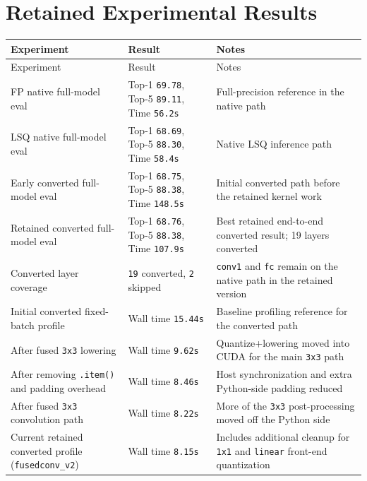\documentclass[11pt,a4paper]{article}
\begin{document}
\section{Retained Experimental Results}
\renewcommand{\arraystretch}{1.2}
\begin{longtable}{>{\raggedright\arraybackslash}p{} >{\raggedleft\arraybackslash}p{} >{\raggedright\arraybackslash}p{}}
\toprule
Experiment & Result & Notes \\
\midrule
\endfirsthead
\toprule
Experiment & Result & Notes \\
\midrule
\endhead
FP native full-model eval & Top-1 \texttt{69.78}, Top-5 \texttt{89.11}, Time \texttt{56.2s} & Full-precision reference in the native path \\
LSQ native full-model eval & Top-1 \texttt{68.69}, Top-5 \texttt{88.30}, Time \texttt{58.4s} & Native LSQ inference path \\
Early converted full-model eval & Top-1 \texttt{68.75}, Top-5 \texttt{88.38}, Time \texttt{148.5s} & Initial converted path before the retained kernel work \\
Retained converted full-model eval & Top-1 \texttt{68.76}, Top-5 \texttt{88.38}, Time \texttt{107.9s} & Best retained end-to-end converted result; 19 layers converted \\
Converted layer coverage & \texttt{19} converted, \texttt{2} skipped & \texttt{conv1} and \texttt{fc} remain on the native path in the retained version \\
Initial converted fixed-batch profile & Wall time \texttt{15.44s} & Baseline profiling reference for the converted path \\
After fused \texttt{3x3} lowering & Wall time \texttt{9.62s} & Quantize+lowering moved into CUDA for the main \texttt{3x3} path \\
After removing \texttt{.item()} and padding overhead & Wall time \texttt{8.46s} & Host synchronization and extra Python-side padding reduced \\
After fused \texttt{3x3} convolution path & Wall time \texttt{8.22s} & More of the \texttt{3x3} post-processing moved off the Python side \\
Current retained converted profile (\texttt{fusedconv\_v2}) & Wall time \texttt{8.15s} & Includes additional cleanup for \texttt{1x1} and \texttt{linear} front-end quantization \\
\bottomrule
\end{longtable}
\end{document}
